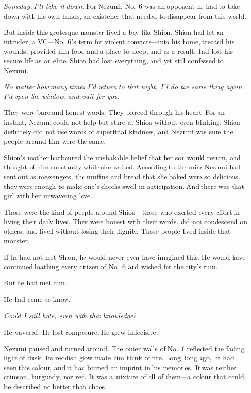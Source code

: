 \emph{Someday, I'll take it down.} For Nezumi, No.~6 was an opponent he had to
take down with his own hands, an existence that needed to disappear from
this world.

But inside this grotesque monster lived a boy like Shion. Shion had let
an intruder, a VC---No.~6's term for violent convicts---into his home,
treated his wounds, provided him food and a place to sleep, and as a
result, had lost his secure life as an elite. Shion had lost everything,
and yet still confessed to Nezumi.

\emph{No matter how many times I'd return to that night, I'd do the same
thing again. I'd open the window, and wait for you.}

They were bare and honest words. They pierced through his heart. For an
instant, Nezumi could not help but stare at Shion without even blinking.
Shion definitely did not use words of superficial kindness, and Nezumi
was sure the people around him were the same.

Shion's mother harboured the unshakable belief that her son would
return, and thought of him constantly while she waited. According to the
mice Nezumi had sent out as messengers, the muffins and bread that she
baked were so delicious, they were enough to make one's cheeks swell in
anticipation. And there was that girl with her unwavering love.

Those were the kind of people around Shion---those who exerted every
effort in living their daily lives. They were honest with their words,
did not condescend on others, and lived without losing their dignity.
Those people lived inside that monster.

If he had not met Shion, he would never even have imagined this. He
would have continued loathing every citizen of No.~6 and wished for the
city's ruin.

But he had met him.

He had come to know.

\emph{Could I still hate, even with that knowledge?}

He wavered. He lost composure. He grew indecisive.

Nezumi paused and turned around. The outer walls of No.~6 reflected the
fading light of dusk. Its reddish glow made him think of fire. Long,
long ago, he had seen this colour, and it had burned an imprint in his
memories. It was neither crimson, burgundy, nor red. It was a mixture of
all of them---a colour that could be described no better than chaos.

